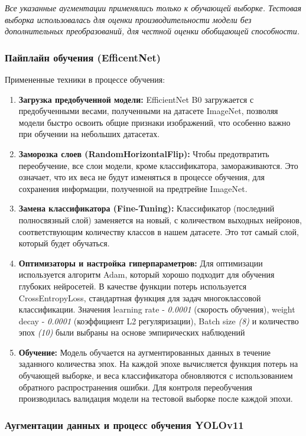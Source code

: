 \documentclass[14pt]{extarticle}
\begin{document}
\textit{Все указанные аугментации применялись только к обучающей выборке. Тестовая выборка использовалась для оценки производительности модели без дополнительных преобразований, для честной оценки обобщающей способности.}
\subsubsection{Пайплайн обучения (EfficentNet)}

Примененные техники в процессе обучения:
\begin{enumerate}
    \item \textbf{Загрузка предобученной модели:} EfficientNet B0 загружается с предобученными весами, полученными на датасете ImageNet, позволяя модели быстро освоить общие признаки изображений, что особенно важно при обучении на небольших датасетах.
    \item \textbf{Заморозка слоев (RandomHorizontalFlip):} Чтобы предотвратить переобучение, все слои модели, кроме классификатора, замораживаются. Это означает, что их веса не будут изменяться в процессе обучения, для сохранения информации, полученной на предтрейне ImageNet. \cite{yosinski2014transferable}
    \item \textbf{Замена классификатора (Fine-Tuning):} Классификатор (последний полносвязный слой) заменяется на новый, с количеством выходных нейронов, соответствующим количеству классов в нашем датасете. Это тот самый слой, который будет обучаться.
    \item \textbf{Оптимизаторы и настройка гиперпараметров:} Для оптимизации используется алгоритм Adam, который хорошо подходит для обучения глубоких нейросетей. В качестве функции потерь используется CrossEntropyLoss, стандартная функция для задач многоклассовой классификации. Значения learning rate - \textit{0.0001} (скорость обучения), weight decay - \textit{0.0001} (коэффициент L2 регуляризации), Batch size \textit{(8)} и количество эпох \textit{(10)} были выбраны на основе эмпирических наблюдений
    \item \textbf{Обучение:} Модель обучается на аугментированных данных в течение заданного количества эпох. На каждой эпохе вычисляется функция потерь на обучающей выборке, и веса классификатора обновляются с использованием обратного распространения ошибки. Для контроля переобучения производилась валидация модели на тестовой выборке после каждой эпохи.
\end{enumerate}

\subsubsection{Аугментации данных и процесс обучения YOLOv11}
\end{document}
